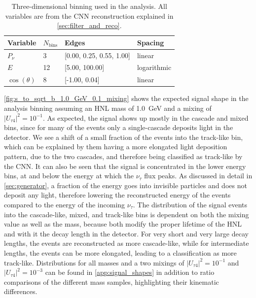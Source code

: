\documentclass[
    aps,
    prd,
    reprint,
    amsmath,
    amssymb,
    nofootinbib,
    superscriptaddress,
    floatfix
]{revtex4-2}
\def\nomathut4{|U_{\tau4}|^2}
\renewcommand{\rm}{\mathrm}
\newcommand{\rm}{\mathrm}
\begin{document}
\begin{table}[h]
    \small
    \begin{tabular}{ llll }
    \hline\hline    
    \textbf{Variable} & \textbf{$N_\rm{bins}$} & \textbf{Edges} & \textbf{Spacing} \\     
    \hline\hline    
    $P_\nu$ & 3 & [0.00, 0.25, 0.55, 1.00] & linear \\
    $E$ & 12 & [5.00, 100.00] & logarithmic \\
    $\cos(\theta)$ & 8 & [-1.00, 0.04] & linear \\    
    \hline
\end{tabular}
\caption{Three-dimensional binning used in the analysis. All variables are from the CNN reconstruction explained in \cref{sec:filter_and_reco}.}
\label{tab:analysis_binning}
\end{table}

\cref{fig:s_to_sqrt_b_1.0_GeV_0.1_mixing} shows the expected signal shape in the analysis binning assuming an HNL mass of \SI{1.0}{\GeV} and a mixing of $\nomathut4=10^{-1}$. As expected, the signal shows up mostly in the cascade and mixed bins, since for many of the events only a single-cascade deposits light in the detector. We see a shift of a small fraction of the events into the track-like bin, which can be explained by them having a more elongated light deposition pattern, due to the two cascades, and therefore being classified as track-like by the CNN. It can also be seen that the signal is concentrated in the lower energy bins, at and below the energy at which the $\nu_\tau$ flux peaks. As discussed in detail in \cref{sec:generator}, a fraction of the energy goes into invisible particles and does not deposit any light, therefore lowering the reconstructed energy of the events compared to the energy of the incoming $\nu_\tau$. The distribution of the signal events into the cascade-like, mixed, and track-like bins is dependent on both the mixing value as well as the mass, because both modify the proper lifetime of the HNL and with it the decay length in the detector. For very short and very large decay lengths, the events are reconstructed as more cascade-like, while for intermediate lengths, the events can be more elongated, leading to a classification as more track-like. Distributions for all masses and a two mixings of $\nomathut4=10^{-1}$ and $\nomathut4=10^{-3}$ can be found in \cref{app:signal_shapes} in addition to ratio comparisons of the different mass samples, highlighting their kinematic differences.
\end{document}
